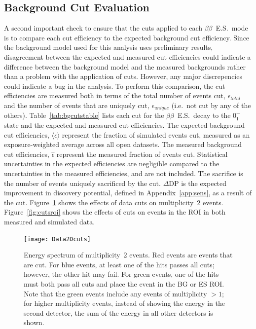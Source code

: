\documentclass[notitlepage,rmp,aps,10pt]{revtex4-1}
\newcommand{\bb}{${\beta \beta}$}
\newcommand{\bbes}{\bb~E.S.}
\newcommand{\SP}[3]{$#1^{#2}_{#3}$}
\begin{document}
\subsection{Background Cut Evaluation} \label{sec:bgcuteval}
A second important check to ensure that the cuts applied to each \bbes\ mode is to compare each cut efficiency to the expected background cut efficiency.
Since the background model used for this analysis uses preliminary results, disagreement between the expected and measured cut efficiencies could indicate a difference between the background model and the measured backgrounds rather than a problem with the application of cuts.
However, any major discrepencies could indicate a bug in the analysis.
To perform this comparison, the cut efficiencies are measured both in terms of the total number of events cut, $\epsilon_{total}$ and the number of events that are uniquely cut, $\epsilon_{unique}$ (i.e.~not cut by any of the others).
Table~\ref{tab:bgcutstable} lists each cut for the \bbes\ decay to the \SP{0}{+}{1} state and the expected and measured cut efficiencies.
The expected background cut efficiencies, $\langle\epsilon\rangle$ represent the fraction of simulated events cut, measured as an exposure-weighted average across all open datasets.
The measured background cut efficiencies, $\hat{\epsilon}$ represent the measured fraction of events cut.
Statistical uncertainties in the expected efficiencies are negligible compared to the uncertainties in the measured efficiencies, and are not included.
The sacrifice is the number of events uniquely sacrificed by the cut.
$\Delta \mathrm{DP}$ is the expected improvement in discovery potential, defined in Appendix~\ref{app:sens}, as a result of the cut.
Figure~\ref{fig:datacuts2D} shows the effects of data cuts on multiplicity~2 events.
Figure~\ref{fig:cutsroi} shows the effects of cuts on events in the ROI in both measured and simulated data.

\begin{figure}
  \centering
  \texttt{[image: Data2Dcuts]}
  \caption[Effect of data cuts on measured multiplicity 2 events]{\label{fig:datacuts2D}
    Energy spectrum of multiplicity~2 events. Red events are events that are cut. For blue events, at least one of the hits passes all cuts; however, the other hit may fail. For green events, one of the hits must both pass all cuts and place the event in the BG or ES ROI. Note that the green events include any events of multiplicity $>1$; for higher multiplicity events, instead of showing the energy in the second detector, the sum of the energy in all other detectors is shown.
  }
\end{figure}
\end{document}
